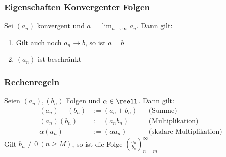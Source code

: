 \documentclass{kit}
\begin{document}
    \subsubsection{Eigenschaften Konvergenter Folgen}
      Sei $(a_n)$ konvergent und $a=\lim_{n\rightarrow\infty}a_n$. Dann gilt:
      \begin{enumerate}
        \item Gilt auch noch $a_n\rightarrow b$, so ist $a=b$
        \item $(a_n)$ ist beschränkt
      \end{enumerate}
    \subsubsection{Rechenregeln}
      Seien $(a_n),(b_n)$ Folgen und $\alpha\in\reell$. Dann gilt:
      \begin{align*}
        (a_n)\pm(b_n) & :=(a_n\pm b_n) && \text{(Summe)}\\
        (a_n)(b_n)&:=(a_nb_n) && \text{(Multiplikation)}\\
        \alpha(a_n) & :=(\alpha a_n) && \text{(skalare Multiplikation)}
      \end{align*}
      Gilt $b_n\neq0\ (n\ge M)$, so ist die Folge $\left(\frac{a_n}{b_n}\right)^\infty_{n=m}$
\end{document}
